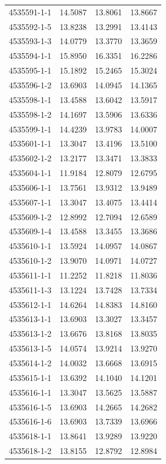 \begin{longtable}{lrrr}
4535591-1-1 & 14.5087 & 13.8061 & 13.8667 \\
4535592-1-5 & 13.8238 & 13.2991 & 13.4143 \\
4535593-1-3 & 14.0779 & 13.3770 & 13.3659 \\
4535594-1-1 & 15.8950 & 16.3351 & 16.2286 \\
4535595-1-1 & 15.1892 & 15.2465 & 15.3024 \\
4535596-1-2 & 13.6903 & 14.0945 & 14.1365 \\
4535598-1-1 & 13.4588 & 13.6042 & 13.5917 \\
4535598-1-2 & 14.1697 & 13.5906 & 13.6336 \\
4535599-1-1 & 14.4239 & 13.9783 & 14.0007 \\
4535601-1-1 & 13.3047 & 13.4196 & 13.5100 \\
4535602-1-2 & 13.2177 & 13.3471 & 13.3833 \\
4535604-1-1 & 11.9184 & 12.8079 & 12.6795 \\
4535606-1-1 & 13.7561 & 13.9312 & 13.9489 \\
4535607-1-1 & 13.3047 & 13.4075 & 13.4414 \\
4535609-1-2 & 12.8992 & 12.7094 & 12.6589 \\
4535609-1-4 & 13.4588 & 13.3455 & 13.3686 \\
4535610-1-1 & 13.5924 & 14.0957 & 14.0867 \\
4535610-1-2 & 13.9070 & 14.0971 & 14.0727 \\
4535611-1-1 & 11.2252 & 11.8218 & 11.8036 \\
4535611-1-3 & 13.1224 & 13.7428 & 13.7334 \\
4535612-1-1 & 14.6264 & 14.8383 & 14.8160 \\
4535613-1-1 & 13.6903 & 13.3027 & 13.3457 \\
4535613-1-2 & 13.6676 & 13.8168 & 13.8035 \\
4535613-1-5 & 14.0574 & 13.9214 & 13.9270 \\
4535614-1-2 & 14.0032 & 13.6668 & 13.6915 \\
4535615-1-1 & 13.6392 & 14.1040 & 14.1201 \\
4535616-1-1 & 13.3047 & 13.5625 & 13.5887 \\
4535616-1-5 & 13.6903 & 14.2665 & 14.2682 \\
4535616-1-6 & 13.6903 & 13.7339 & 13.6966 \\
4535618-1-1 & 13.8641 & 13.9289 & 13.9220 \\
4535618-1-2 & 13.8155 & 12.8792 & 12.8984 \\

\end{longtable}
